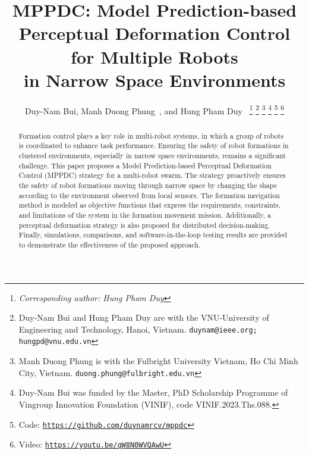 \documentclass[letterpaper, 10 pt, journal, twoside]{IEEEtran}
\begin{document}
\title{MPPDC: Model Prediction-based Perceptual Deformation Control for Multiple Robots\\in Narrow Space Environments
}


\author{Duy-Nam Bui, Manh Duong Phung~, and Hung Pham Duy~%
\thanks{\textit{Corresponding author: Hung Pham Duy}}
\thanks{Duy-Nam Bui and Hung Pham Duy are with the VNU-University of Engineering and Technology, Hanoi, Vietnam. {\tt\footnotesize duynam@ieee.org; hungpd@vnu.edu.vn}}
\thanks{Manh Duong Phung is with the Fulbright University Vietnam, Ho Chi Minh City, Vietnam. {\tt\footnotesize duong.phung@fulbright.edu.vn}}
\thanks{Duy-Nam Bui was funded by the Master, PhD Scholarship Programme of Vingroup Innovation Foundation (VINIF), code VINIF.2023.Ths.088.}
\thanks{Code: {\tt\url{https://github.com/duynamrcv/mppdc}}}
\thanks{Video: {\tt\url{https://youtu.be/qW8N0WVQAwU}}}
}



\maketitle


\begin{abstract}
Formation control plays a key role in multi-robot systems, in which a group of robots is coordinated to enhance task performance. Ensuring the safety of robot formations in clustered environments, especially in narrow space environments, remains a significant challenge. This paper proposes a Model Prediction-based Perceptual Deformation Control (MPPDC) strategy for a multi-robot swarm. The strategy proactively ensures the safety of robot formations moving through narrow space by changing the shape according to the environment observed from local sensors. The formation navigation method is modeled as objective functions that express the requirements, constraints, and limitations of the system in the formation movement mission. Additionally, a perceptual deformation strategy is also proposed for distributed decision-making. Finally, simulations, comparisons, and software-in-the-loop testing results are provided to demonstrate the effectiveness of the proposed approach.
\end{abstract}
\end{document}

